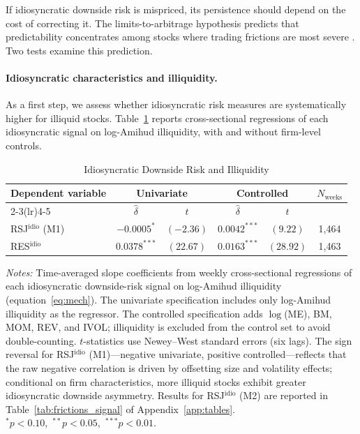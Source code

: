 \documentclass[11pt,a4paper]{article}
\begin{document}
If idiosyncratic downside risk is mispriced, its persistence should depend on the cost
of correcting it. The limits-to-arbitrage hypothesis predicts that predictability
concentrates among stocks where trading frictions are most severe \citep{shleifer1997}.
Two tests examine this prediction.

\paragraph{Idiosyncratic characteristics and illiquidity.}
As a first step, we assess whether idiosyncratic risk measures are systematically higher
for illiquid stocks. Table~\ref{tab:illiquidity} reports cross-sectional regressions of
each idiosyncratic signal on log-Amihud illiquidity, with and without firm-level controls.

\begin{table}[!htbp]
\centering
\caption{Idiosyncratic Downside Risk and Illiquidity}
\label{tab:illiquidity}
\small
\begin{threeparttable}
\begin{tabular}{l c c c c c}
\toprule
Dependent variable
  & \multicolumn{2}{c}{Univariate}
  & \multicolumn{2}{c}{Controlled}
  & $N_{\text{weeks}}$ \\
\cmidrule(lr){2-3}\cmidrule(lr){4-5}
  & $\hat\delta$ & $t$ & $\hat\delta$ & $t$ & \\
\midrule
RSJ$^{\text{idio}}$ (M1)
  & $-0.0005^{*}$ & $(-2.36)$ & $0.0042^{***}$ & $(9.22)$ & 1{,}464 \\[3pt]
RES$^{\text{idio}}$
  & $0.0378^{***}$ & $(22.67)$ & $0.0163^{***}$ & $(28.92)$ & 1{,}463 \\
\bottomrule
\end{tabular}
\begin{tablenotes}
\footnotesize
\item \textit{Notes:} Time-averaged slope coefficients from weekly cross-sectional
regressions of each idiosyncratic downside-risk signal on log-Amihud illiquidity
(equation~\eqref{eq:mech}). The univariate specification includes only log-Amihud
illiquidity as the regressor. The controlled specification adds $\log$(ME), BM, MOM,
REV, and IVOL; illiquidity is excluded from the control set to avoid double-counting.
$t$-statistics use Newey--West standard errors (six lags). The sign reversal for
RSJ$^{\text{idio}}$ (M1)---negative univariate, positive controlled---reflects that
the raw negative correlation is driven by offsetting size and volatility effects;
conditional on firm characteristics, more illiquid stocks exhibit greater idiosyncratic
downside asymmetry. Results for RSJ$^{\text{idio}}$ (M2) are reported in
Table~\ref{tab:frictions_signal} of Appendix~\ref{app:tables}. \\
$^{*}p<0.10$,\ $^{**}p<0.05$,\ $^{***}p<0.01$.
\end{tablenotes}
\end{threeparttable}
\end{table}
\end{document}
